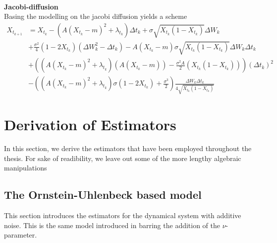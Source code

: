 \\
\textbf{Jacobi-diffusion}\\
Basing the modelling on the jacobi diffusion yields a scheme
\begin{align}
    X_{t_{k + 1}} &= X_{t_k} - \left(A(X_{t_k} - m)^2 + \lambda_{t_k}\right) \Delta t_k + \sigma \sqrt{X_{t_k}\left(1-X_{t_k}\right)} \Delta W_{k} \nonumber\\
    &+ \frac{\sigma^2}{4}\left(1 - 2X_{t_k}\right)\left(\Delta W_k^2 - \Delta t_k\right) - A\left(X_{t_k} - m\right)\sigma \sqrt{X_{t_k}\left(1 - X_{t_k}\right)}\Delta W_k\Delta t_k \nonumber \\
    &+ \left(\left(A\left(X_{t_k} - m\right)^2 + \lambda_{t_k}\right)\left(A\left(X_{t_k} - m\right)\right) - \frac{\sigma^2A}{2}\left(X_{t_k}\left(1 - X_{t_k}\right)\right)\right)\left(\Delta t_k\right)^2 \nonumber \\
    &- \left(\left(A\left(X_{t_k} - m\right)^2 + \lambda_{t_k}\right)\sigma\left(1 - 2X_{t_k}\right) + \frac{\sigma^3}{2}\right)\frac{\Delta W_k \Delta t_k}{4\sqrt{X_{t_k}\left(1 - X_{t_k}\right)}} \label{eq:jacobiDiffusion}
\end{align}
\section{Derivation of Estimators}\label{sec:AppendixEstim}
In this section, we derive the estimators that have been employed throughout the thesis. For sake of readibility, we leave out some of the more lengthy algebraic manipulations
\subsection{The Ornstein-Uhlenbeck based model}\label{subsec:OUprocess}
This section introduces the estimators for the dynamical system with additive noise. This is the same model introduced in \cite[equation (1)]{Ditlevsen2023} barring the addition of the $\nu$-parameter.
